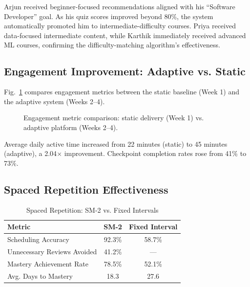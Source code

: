 \documentclass[conference]{IEEEtran}
\begin{document}
Arjun received beginner-focused recommendations aligned with his ``Software Developer'' goal. As his quiz scores improved beyond 80\%, the system automatically promoted him to intermediate-difficulty courses. Priya received data-focused intermediate content, while Karthik immediately received advanced ML courses, confirming the difficulty-matching algorithm's effectiveness.

\subsection{Engagement Improvement: Adaptive vs. Static}

Fig.~\ref{fig:engagement_comparison} compares engagement metrics between the static baseline (Week 1) and the adaptive system (Weeks 2--4).

\begin{figure}[htbp]
\centerline{}
\caption{Engagement metric comparison: static delivery (Week 1) vs. adaptive platform (Weeks 2--4).}
\label{fig:engagement_comparison}
\end{figure}

Average daily active time increased from 22 minutes (static) to 45 minutes (adaptive), a 2.04$\times$ improvement. Checkpoint completion rates rose from 41\% to 73\%.

\subsection{Spaced Repetition Effectiveness}

\begin{table}[htbp]
\caption{Spaced Repetition: SM-2 vs. Fixed Intervals}
\label{tab:spaced_rep}
\centering
\begin{tabular}{lcc}
\toprule
\textbf{Metric} & \textbf{SM-2} & \textbf{Fixed Interval} \\
\midrule
Scheduling Accuracy & 92.3\% & 58.7\% \\
Unnecessary Reviews Avoided & 41.2\% & --- \\
Mastery Achievement Rate & 78.5\% & 52.1\% \\
Avg. Days to Mastery & 18.3 & 27.6 \\
\bottomrule
\end{tabular}
\end{table}
\end{document}
